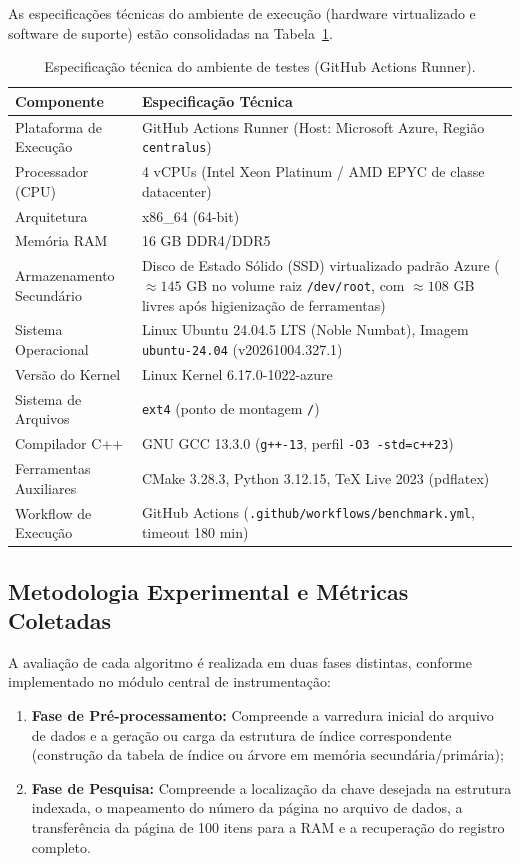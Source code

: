 \documentclass[12pt,a4paper]{article}
\begin{document}
As especificações técnicas do ambiente de execução (hardware virtualizado e software de suporte) estão consolidadas na Tabela~\ref{tab:hardware}.

\begin{table}[H]
\centering
\caption{Especificação técnica do ambiente de testes (GitHub Actions Runner).}
\label{tab:hardware}
\begin{tabular}{p{} p{}}
\toprule
\textbf{Componente} & \textbf{Especificação Técnica} \\
\midrule
Plataforma de Execução & GitHub Actions Runner (Host: Microsoft Azure, Região \texttt{centralus}) \\
Processador (CPU) & 4 vCPUs (Intel Xeon Platinum / AMD EPYC de classe datacenter) \\
Arquitetura & x86\_64 (64-bit) \\
Memória RAM & 16 GB DDR4/DDR5 \\
Armazenamento Secundário & Disco de Estado Sólido (SSD) virtualizado padrão Azure ($\approx 145$ GB no volume raiz \texttt{/dev/root}, com $\approx 108$ GB livres após higienização de ferramentas) \\
Sistema Operacional & Linux Ubuntu 24.04.5 LTS (Noble Numbat), Imagem \texttt{ubuntu-24.04} (v20261004.327.1) \\
Versão do Kernel & Linux Kernel 6.17.0-1022-azure \\
Sistema de Arquivos & \texttt{ext4} (ponto de montagem \texttt{/}) \\
Compilador C++ & GNU GCC 13.3.0 (\texttt{g++-13}, perfil \texttt{-O3 -std=c++23}) \\
Ferramentas Auxiliares & CMake 3.28.3, Python 3.12.15, TeX Live 2023 (pdflatex) \\
Workflow de Execução & GitHub Actions (\texttt{.github/}\allowbreak\texttt{workflows/}\allowbreak\texttt{benchmark.yml}, timeout 180 min) \\
\bottomrule
\end{tabular}
\end{table}

\subsection{Metodologia Experimental e Métricas Coletadas}
A avaliação de cada algoritmo é realizada em duas fases distintas, conforme implementado no módulo central de instrumentação:
\begin{enumerate}
    \item \textbf{Fase de Pré-processamento:} Compreende a varredura inicial do arquivo de dados e a geração ou carga da estrutura de índice correspondente (construção da tabela de índice ou árvore em memória secundária/primária);
    \item \textbf{Fase de Pesquisa:} Compreende a localização da chave desejada na estrutura indexada, o mapeamento do número da página no arquivo de dados, a transferência da página de 100 itens para a RAM e a recuperação do registro completo.
\end{enumerate}
\end{document}
